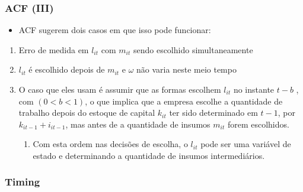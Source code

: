 \documentclass{beamer}
\begin{document}
\begin{frame}\frametitle{ACF (III)}

\begin{itemize}
\item ACF sugerem dois casos em que isso pode funcionar:
\end{itemize}
\begin{enumerate}
\item Erro de medida em $l_{it}$ com $m_{it}$ sendo escolhido simultaneamente
\item $l_{it}$ é escolhido depois de $m_{it}$ e $\omega$ não varia neste
meio tempo
\item O caso que eles usam é assumir que as formas escolhem $l_{it}$ no
instante $t-b$ , com $(0<b<1)$, o que implica que a empresa escolhe
a quantidade de trabalho depois do estoque de capital $k_{it}$ ter
sido determinado em $t-1$, por $k_{it-1}+i_{it-1}$, mas antes de
a quantidade de insumos $m_{it}$ forem escolhidos. 

\begin{enumerate}
\item Com esta ordem nas decisões de escolha, o $l_{it}$ pode ser uma variável
de estado e determinando a quantidade de insumos intermediários.
\end{enumerate}
\end{enumerate}
\end{frame}

\begin{frame}\frametitle{Timing}


\end{frame}
\end{document}
